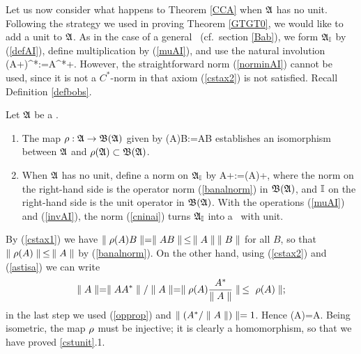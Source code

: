 Let us now consider what happens to Theorem \ref{CCA} when ${\frak A}$ has no
unit.  Following the strategy we used in proving Theorem \ref{GTGT0},
we would like to add a unit to ${\frak A}$.  As in the case of a general \BA\
(cf.\ section \ref{Bab}), we form ${\frak A}_{\Bbb I}$ by (\ref{defAI}), define
multiplication by (\ref{muAI}), and use the natural involution \be
(A+\lm\I)^*:=A^*+\ovl{\lm}\I. \ll{invAI} \ee However, the
straightforward norm (\ref{norminAI}) cannot be used, since it is not
a $C^*$-norm in that axiom (\ref{cstax2}) is not satisfied.  Recall
Definition \ref{defbobs}.
\begin{Lemma}
Let ${\frak A}$ be a \ca.
\begin{enumerate}
\item
The map $\rho:{\frak A}\rightarrow{\frak B}({\frak A})$ given by \be \rh(A)B:=AB  \ee
establishes an isomorphism between ${\frak A}$ and $\rho({\frak A})\subset{\frak B}({\frak A})$.
\item
When ${\frak A}$ has no unit, define a norm on ${\frak A}_{\Bbb I}$ by \be \n
A+\lm\I\n:=\n\rh(A)+\lm\I\n,  \ee where the norm on the
right-hand side is the operator norm (\ref{banalnorm}) in ${\frak B}({\frak A})$,
and ${\Bbb I}$ on the right-hand side is the unit operator in ${\frak B}({\frak A})$.
With the operations (\ref{muAI}) and (\ref{invAI}), the norm
(\ref{cninai}) turns ${\frak A}_{\Bbb I}$ into a \ca\ with unit.
\end{enumerate}
\end{Lemma}

By (\ref{cstax1}) we have $\parallel\rho(A)B\parallel=\parallel AB\parallel\,\leq\,\parallel A\parallel\:\parallel B\parallel$
for all $B$, so that $\parallel\rho(A)\parallel\,\leq\,\parallel A\parallel$ by (\ref{banalnorm}).
On the other hand, using (\ref{cstax2}) and (\ref{astisa}) we can
write
$$
\parallel A\parallel =\parallel AA^*\parallel/\parallel A\parallel=\parallel\rho(A)\frac{A^*}{\parallel
A\parallel}\parallel\,\leq\,\,\rho(A)\parallel;
$$
in the last step we used (\ref{opprop}) and $\parallel (A^*/\parallel A\parallel)\parallel=1$.
Hence \be \n\rh(A)\n=\n A\n. \ll{rhisom} \ee Being isometric, the map
$\rho$ must be injective; it is clearly a homomorphism, so that we have
proved \ref{cstunit}.1.

